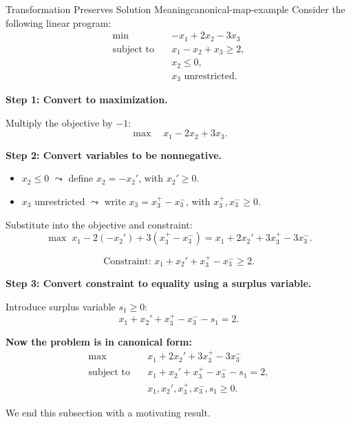\begin{example}{Transformation Preserves Solution Meaning}{canonical-map-example}
Consider the following linear program:
\[
\begin{aligned}
\min \quad & -x_1 + 2x_2 - 3x_3 \\
\text{subject to} \quad
& x_1 - x_2 + x_3 \geq 2, \\
& x_2 \leq 0, \\
& x_3 \text{ unrestricted}.
\end{aligned}
\]

\textbf{Step 1: Convert to maximization.}

Multiply the objective by \( -1 \):
\[
\max \quad x_1 - 2x_2 + 3x_3.
\]

\textbf{Step 2: Convert variables to be nonnegative.}

\begin{itemize}
    \item \( x_2 \leq 0 \) \( \leadsto \) define \( x_2 = -x_2' \), with \( x_2' \geq 0 \).
    \item \( x_3 \) unrestricted \( \leadsto \) write \( x_3 = x_3^+ - x_3^- \), with \( x_3^+, x_3^- \geq 0 \).
\end{itemize}

Substitute into the objective and constraint:
\[
\max \; x_1 - 2(-x_2') + 3(x_3^+ - x_3^-) = x_1 + 2x_2' + 3x_3^+ - 3x_3^-.
\]

\[
\text{Constraint: } x_1 + x_2' + x_3^+ - x_3^- \geq 2.
\]

\textbf{Step 3: Convert constraint to equality using a surplus variable.}

Introduce surplus variable \( s_1 \geq 0 \):
\[
x_1 + x_2' + x_3^+ - x_3^- - s_1 = 2.
\]

\textbf{Now the problem is in canonical form:}
\[
\begin{aligned}
\max \quad & x_1 + 2x_2' + 3x_3^+ - 3x_3^- \\
\text{subject to} \quad & x_1 + x_2' + x_3^+ - x_3^- - s_1 = 2, \\
& x_1, x_2', x_3^+, x_3^-, s_1 \geq 0.
\end{aligned}
\]
\end{example}






We end this subsection with a motivating result.

